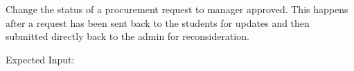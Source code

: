 \documentclass[letterpaper,10pt,english]{sphinxmanual}
\begin{document}
\begin{fulllineitems}
\begin{fulllineitems}
\end{fulllineitems}


\begin{fulllineitems}
\label{\detokenize{apidoc/utdesign_procurement:utdesign_procurement.apigateway.ApiGateway.procurementResubmitToAdmin}}
Change the status of a procurement request to manager approved. This
happens after a request has been sent back to the students for updates
and then submitted directly back to the admin for reconsideration.

Expected Input:


\end{fulllineitems}
\end{fulllineitems}
\end{document}

